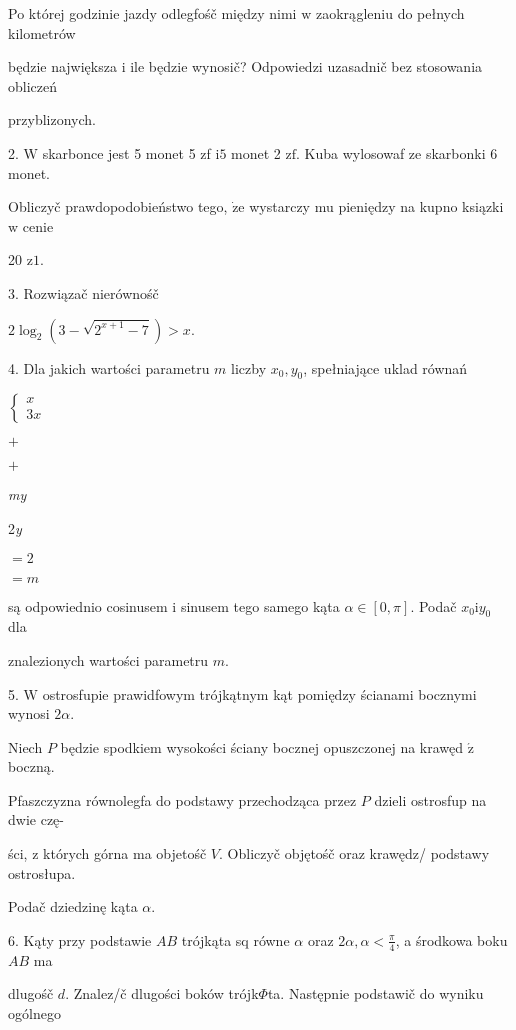 \documentclass[a4paper,12pt]{article}
\begin{document}
Po której godzinie jazdy odlegfośč między nimi $\mathrm{w}$ zaokrągleniu do pełnych kilometrów

będzie największa $\mathrm{i}$ ile będzie wynosič? Odpowiedzi uzasadnič bez stosowania obliczeń

przyblizonych.

2. $\mathrm{W}$ skarbonce jest 5 monet 5 zf $\mathrm{i}5$ monet 2 $\mathrm{z}\mathrm{f}$. Kuba wylosowaf ze skarbonki 6 monet.

Obliczyč prawdopodobieństwo tego, $\dot{\mathrm{z}}\mathrm{e}$ wystarczy mu pieniędzy na kupno ksiązki $\mathrm{w}$ cenie

20 $\mathrm{z}1.$

3. Rozwiązač nierównośč

$2\log_{2}(3-\sqrt{2^{x+1}-7})>x.$

4. Dla jakich wartości parametru $m$ liczby $x_{0}, y_{0}$, spełniające uklad równań

$\left\{\begin{array}{l}
x\\
3x
\end{array}\right.$

$+$

$+$

{\it my}

2{\it y}

$=2$

$=m$

są odpowiednio cosinusem $\mathrm{i}$ sinusem tego samego kąta $\alpha \in [0,\pi]$. Podač $x_{0} \mathrm{i} y_{0}$ dla

znalezionych wartości parametru $m.$

5. $\mathrm{W}$ ostrosfupie prawidfowym trójkątnym kąt pomiędzy ścianami bocznymi wynosi $2\alpha.$

Niech $P$ będzie spodkiem wysokości ściany bocznej opuszczonej na krawęd $\acute{\mathrm{z}}$ boczną.

Pfaszczyzna równolegfa do podstawy przechodząca przez $P$ dzieli ostrosfup na dwie czę-

ści, $\mathrm{z}$ których górna ma objetośč $V$. Obliczyč objętośč oraz krawędz/ podstawy ostrosłupa.

Podač dziedzinę kąta $\alpha.$

6. Kąty przy podstawie $AB$ trójkąta sq równe $\alpha$ oraz $2\alpha, \displaystyle \alpha<\frac{\pi}{4}$, a środkowa boku $AB$ ma

dlugośč $d$. Znalez/č dlugości boków trójk$\Phi$ta. Następnie podstawič do wyniku ogólnego
\end{document}
